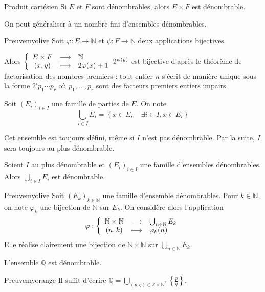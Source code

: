     \begin{prop}{Produit cartésien}{}
        Si $E$ et $F$ sont dénombrables, alors $E \times F$ est dénombrable.
    \end{prop}

    On peut généraliser à un nombre fini d’ensembles dénombrables.

    \begin{demo}{Preuve}{myolive}
        Soit $\varphi : E \to \mathbb{N}$ et $\psi : F \to \mathbb{N}$ deux applications bijectives. 

        Alors $\application{E \times F}{\mathbb{N}}{(x,y)}{2 \varphi(x) + 1} 2^{\psi(y)}$ est bijective d’après le théorème de factorisation des nombres premiers : tout entier $n$ s’écrit de manière unique sous la forme $2^i p_1 \cdots p_r$ où $p_1, \ldots, p_r$ sont des facteurs premiers entiers impairs.
    \end{demo}

    \begin{defi}{}{}
        Soit $(E_i)_{i \in I}$ une famille de parties de $E$. On note 
        \[ \bigcup_{i \in I} E_i = \left\{x \in E, \quad \exists i \in I, x \in E_i\right\} \]    
    \end{defi}

    Cet ensemble est toujours défini, même si $I$ n’est pas dénombrable. Par la suite, $I$ sera toujours au plus dénombrable.

    \begin{prop}{}{}
        Soient $I$ au plus dénombrable et $(E_i)_{i \in I}$ une famille d’ensembles dénombrables. Alors $\bigcup_{i \in I} E_i$ est dénombrable.
    \end{prop}

    \begin{demo}{Preuve}{myolive}
        Soit $(E_k)_{k \in \mathbb{N}}$ une famille d’ensemble dénombrables. Pour $k \in \mathbb{N}$, on note $\varphi_k$ une bijection de $\mathbb{N}$ sur $E_k$. On considère alors l’application 
        \[ \fonction{\varphi}{\mathbb{N} \times \mathbb{N}}{\bigcup_{n \in \mathbb{N}} E_k}{(n,k)}{\varphi_k(n)} \]    
        Elle réalise clairement une bijection de $\mathbb{N} \times \mathbb{N}$ sur $\bigcup_{n \in \mathbb{N}} E_k$.
    \end{demo}

    \begin{coro}{}{}
        L’ensemble $\mathbb{Q}$ est dénombrable.
    \end{coro}

    \begin{demo}{Preuve}{myorange}
        Il suffit d’écrire $\mathbb{Q} = \bigcup_{(p,q) \in \mathbb{Z} \times \mathbb{N}^*} \left\{\frac{p}{q}\right\}$.
    \end{demo}

